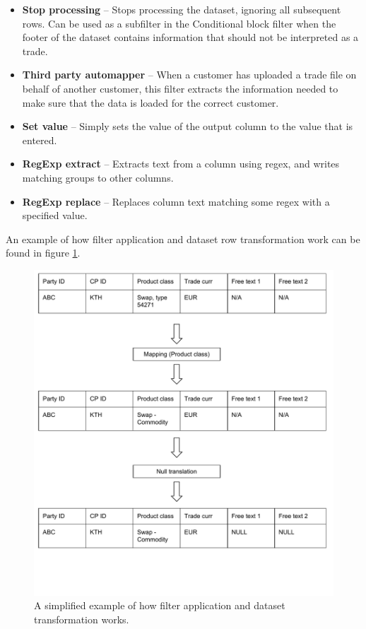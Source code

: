 \begin{itemize}
\item \textbf{Stop processing} --
Stops processing the dataset, ignoring all subsequent rows. Can be used as a subfilter in the Conditional block filter when the footer of the dataset
contains information that should not be interpreted as a trade.

\item \textbf{Third party automapper} --
When a customer has uploaded a trade file on behalf of another customer, this filter extracts the information needed to make sure that the data is loaded
for the correct customer.

\item \textbf{Set value} --
Simply sets the value of the output column to the value that is entered.

\item \textbf{RegExp extract} --
Extracts text from a column using regex, and writes matching groups to other columns.

\item \textbf{RegExp replace} --
Replaces column text matching some regex with a specified value.

\end{itemize}

An example of how filter application and dataset row transformation work can be found in figure \ref{fig:filter_diagram}.

\begin{figure}[ht]
  \centering
  \includegraphics[width=120mm]{figures/filter_diagram.pdf}
  \caption[Filter application example.]{A simplified example of how filter application and dataset transformation works.}
  \label{fig:filter_diagram}
\end{figure}

